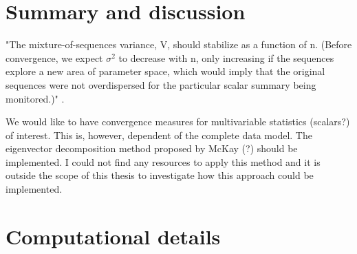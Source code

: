 \documentclass[article]{jss}
\begin{document}
\begin{table}[ht]
\begin{tabular}{lrrrrrr}
   \hline
\end{tabular}
\label{subsetresults}
\end{table}









\section{Summary and discussion} \label{sec:summary}


"The mixture-of-sequences variance, V, should stabilize as a function of n. (Before convergence, we expect $\sigma^2$ to decrease with n, only increasing if the sequences explore a new area of parameter space, which would imply that the original sequences were not overdispersed for the particular scalar summary being monitored.)" \cite[p~438]{broo98}.

We would like to have convergence measures for multivariable statistics (scalars?) of interest. This is, however, dependent of the complete data model. The eigenvector decomposition method proposed by McKay (?) should be implemented. I could not find any resources to apply this method and it is outside the scope of this thesis to investigate how this approach could be implemented.



\section*{Computational details}
\end{document}
